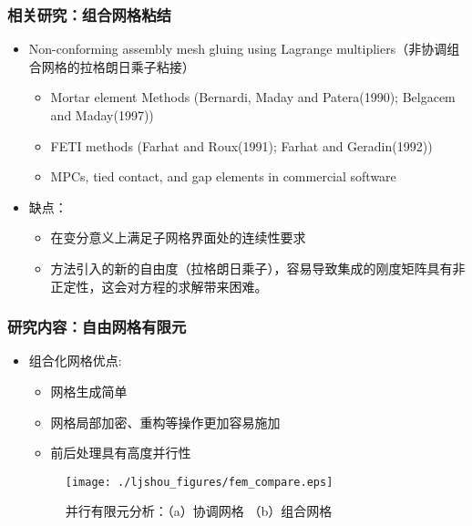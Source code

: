 \documentclass[mathserif]{beamer}
\begin{document}
\begin{CJK}{UTF8}{gkai}
\begin{frame}
	\frametitle{相关研究：组合网格粘结}
	\begin{itemize}
	  \item Non-conforming assembly mesh gluing using Lagrange multipliers（非协调组合网格的拉格朗日乘子粘接）
	  \begin{itemize}
	  	\scriptsize
		\item Mortar element Methods (Bernardi, Maday and Patera(1990); Belgacem and Maday(1997))
		\item FETI methods (Farhat and Roux(1991); Farhat and Geradin(1992)) 
		\item MPCs, tied contact, and gap elements in commercial software
	  \end{itemize}
	  \item 缺点： 
	    \begin{itemize}
	    \item 在变分意义上满足子网格界面处的连续性要求
	    \item 方法引入的新的自由度（拉格朗日乘子），容易导致集成的{\color{red}刚度矩阵具有非正定性}，这会对方程的求解带来困难。
	    \end{itemize}
	\end{itemize}
\end{frame}



	\begin{frame}
	\frametitle{研究内容：自由网格有限元}
		\begin{itemize}
			\item 组合化网格优点: 
				\begin{itemize}
					\item 网格生成简单
					\item 网格局部加密、重构等操作更加容易施加
					\item 前后处理具有高度并行性
				\end{itemize}
				\begin{figure}
    					\centering
    					\texttt{[image: ./ljshou\_figures/fem\_compare.eps]}
    					\caption{并行有限元分析：（a）协调网格 （b）组合网格}
		        \end{figure}
		\end{itemize}
	\end{frame}	
	

\end{CJK}
\end{document}
